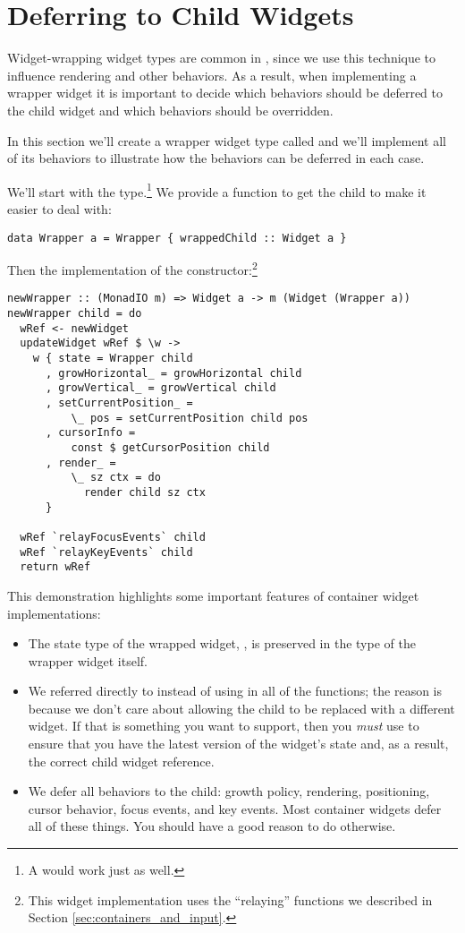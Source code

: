 \section{Deferring to Child Widgets}

Widget-wrapping widget types are common in , since we use
this technique to influence rendering and other behaviors.  As a
result, when implementing a wrapper widget it is important to decide
which behaviors should be deferred to the child widget and which
behaviors should be overridden.

In this section we'll create a wrapper widget type called 
and we'll implement all of its behaviors to illustrate how the
behaviors can be deferred in each case.

We'll start with the type.\footnote{A  would work just as
  well.}  We provide a function to get the child to make it easier to
deal with:

\begin{verbatim}
data Wrapper a = Wrapper { wrappedChild :: Widget a }
\end{verbatim}

Then the implementation of the constructor:\footnote{This widget
  implementation uses the ``relaying'' functions we described in
  Section \ref{sec:containers_and_input}.}

\begin{verbatim}
newWrapper :: (MonadIO m) => Widget a -> m (Widget (Wrapper a))
newWrapper child = do
  wRef <- newWidget
  updateWidget wRef $ \w ->
    w { state = Wrapper child
      , growHorizontal_ = growHorizontal child
      , growVertical_ = growVertical child
      , setCurrentPosition_ =
          \_ pos = setCurrentPosition child pos
      , cursorInfo =
          const $ getCursorPosition child
      , render_ =
          \_ sz ctx = do
            render child sz ctx
      }

  wRef `relayFocusEvents` child
  wRef `relayKeyEvents` child
  return wRef
\end{verbatim}

This demonstration highlights some important features of container
widget implementations:

\begin{itemize}
\item The state type of the wrapped widget, , is preserved in
  the type of the wrapper widget itself.
\item We referred directly to  instead of using
   in all of the functions; the reason is because we
  don't care about allowing the child to be replaced with a different
  widget.  If that is something you want to support, then you
  \textit{must} use  to ensure that you have the latest
  version of the widget's state and, as a result, the correct child
  widget reference.
\item We defer all behaviors to the child: growth policy, rendering,
  positioning, cursor behavior, focus events, and key events.  Most
  container widgets defer all of these things.  You should have a good
  reason to do otherwise.
\end{itemize}

